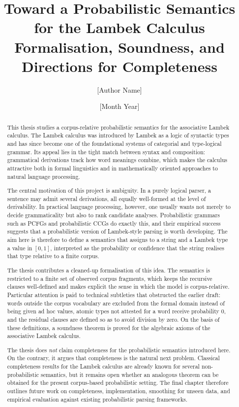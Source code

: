 \documentclass[12pt,a4paper]{report}
\title{Toward a Probabilistic Semantics for the Lambek Calculus\\\large Formalisation, Soundness, and Directions for Completeness}
\author{[Author Name]}
\date{[Month Year]}
\theoremstyle{definition}
\begin{document}
\maketitle
{}

\begin{abstract}
This thesis studies a corpus-relative probabilistic semantics for the associative Lambek
calculus. The Lambek calculus was introduced by Lambek as a logic of syntactic types and has
since become one of the foundational systems of categorial and type-logical grammar.
Its appeal lies in the tight match between syntax and composition: grammatical derivations
track how word meanings combine, which makes the calculus attractive both in formal
linguistics and in mathematically oriented approaches to natural language processing.

The central motivation of this project is ambiguity. In a purely logical parser, a sentence may
admit several derivations, all equally well-formed at the level of derivability. In practical
language processing, however, one usually wants not merely to decide grammaticality but also
to rank candidate analyses. Probabilistic grammars such as PCFGs and probabilistic CCGs do
exactly this, and their empirical success suggests that a probabilistic version of Lambek-style
parsing is worth developing. The aim here is therefore to define a semantics that assigns to a
string and a Lambek type a value in $[0,1]$, interpreted as the probability or confidence that
the string realises that type relative to a finite corpus.

The thesis contributes a cleaned-up formalisation of this idea. The semantics is restricted to a
finite set of observed corpus fragments, which keeps the recursive clauses well-defined and makes
explicit the sense in which the model is corpus-relative. Particular attention is paid to technical
subtleties that obstructed the earlier draft: words outside the corpus vocabulary are excluded
from the formal domain instead of being given ad hoc values, atomic types not attested for a
word receive probability $0$, and the residual clauses are defined so as to avoid division by
zero. On the basis of these definitions, a soundness theorem is proved for the algebraic axioms
of the associative Lambek calculus.

The thesis does \emph{not} claim completeness for the probabilistic semantics introduced here.
On the contrary, it argues that completeness is the natural next problem. Classical completeness
results for the Lambek calculus are already known for several non-probabilistic semantics, but
it remains open whether an analogous theorem can be obtained for the present corpus-based
probabilistic setting. The final chapter therefore outlines future work on completeness,
implementation, smoothing for unseen data, and empirical evaluation against existing
probabilistic parsing frameworks.
\end{abstract}

\tableofcontents
\clearpage
{}







\printbibliography
\end{document}
